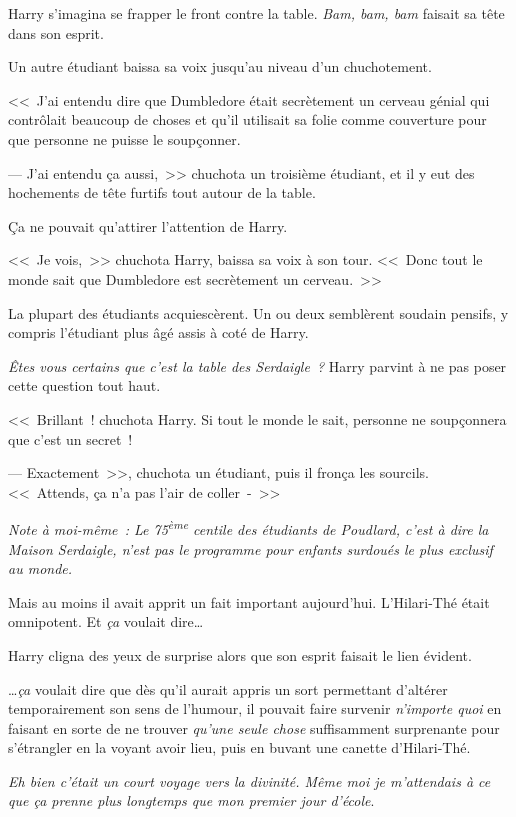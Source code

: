 Harry s'imagina se frapper le front contre la table. \emph{Bam, bam, bam} faisait sa tête dans son esprit.

Un autre étudiant baissa sa voix jusqu'au niveau d'un chuchotement.

<<~J'ai entendu dire que Dumbledore était secrètement un cerveau génial qui contrôlait beaucoup de choses et qu'il utilisait sa folie comme couverture pour que personne ne puisse le soupçonner.

--- J'ai entendu ça aussi,~>> chuchota un troisième étudiant, et il y eut des hochements de tête furtifs tout autour de la table.

Ça ne pouvait qu'attirer l'attention de Harry.

<<~Je vois,~>> chuchota Harry, baissa sa voix à son tour. <<~Donc tout le monde sait que Dumbledore est secrètement un cerveau.~>>

La plupart des étudiants acquiescèrent. Un ou deux semblèrent soudain pensifs, y compris l'étudiant plus âgé assis à coté de Harry.

\emph{Êtes vous certains que c'est la table des Serdaigle~?} Harry parvint à ne pas poser cette question tout haut.

<<~Brillant~! chuchota Harry. Si tout le monde le sait, personne ne soupçonnera que c'est un secret~!

--- Exactement~>>, chuchota un étudiant, puis il fronça les sourcils. <<~Attends, ça n'a pas l'air de coller~-~>>

\emph{Note à moi-même~: Le 75\textsuperscript{ème} centile des étudiants de Poudlard, c'est à dire la Maison Serdaigle, n'est pas le programme pour enfants surdoués le plus exclusif au monde.}

Mais au moins il avait apprit un fait important aujourd'hui. L'Hilari-Thé était omnipotent. Et \emph{ça} voulait dire…

Harry cligna des yeux de surprise alors que son esprit faisait le lien évident.

…\emph{ça} voulait dire que dès qu'il aurait appris un sort permettant d'altérer temporairement son sens de l'humour, il pouvait faire survenir \emph{n'importe quoi} en faisant en sorte de ne trouver \emph{qu'une seule chose} suffisamment surprenante pour s'étrangler en la voyant avoir lieu, puis en buvant une canette d'Hilari-Thé.

\emph{Eh bien c'était un court voyage vers la divinité. Même moi je m'attendais à ce que ça prenne plus longtemps que mon premier jour d'école}.

